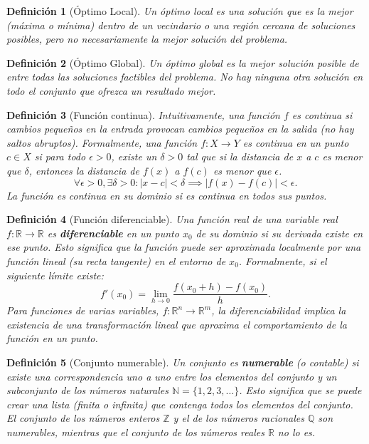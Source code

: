 \documentclass[12pt,a4paper]{book}
\newtheorem{defi}{Definición}[section]
\begin{document}
\begin{defi}[Óptimo Local]
\label{def:optimo_local}
Un óptimo local es una solución que es la mejor (máxima o mínima) dentro de un vecindario o una región cercana de soluciones posibles,
pero no necesariamente la mejor solución del problema.
\end{defi}

\begin{defi}[Óptimo Global]
\label{def:optimo_global}
Un óptimo global es la mejor solución posible de entre todas las soluciones factibles del problema.
No hay ninguna otra solución en todo el conjunto que ofrezca un resultado mejor.

\end{defi}


\begin{defi}[Función continua]
\label{def:fun_continua}
Intuitivamente, una función $f$ es continua si cambios pequeños en la entrada provocan cambios pequeños en la salida (no hay saltos abruptos). Formalmente, una función $f: X \to Y$ es continua en un punto $c \in X$ si para todo $\epsilon > 0$, existe un $\delta > 0$ tal que si la distancia de $x$ a $c$ es menor que $\delta$, entonces la distancia de $f(x)$ a $f(c)$ es menor que $\epsilon$.
$$ \forall \epsilon > 0, \exists \delta > 0 : |x-c| < \delta \implies |f(x)-f(c)| < \epsilon .$$
La función es continua en su dominio si es continua en todos sus puntos.
\end{defi}

\begin{defi}[Función diferenciable]
    \label{def:fun_diferenciable}
Una función real de una variable real $f: \mathbb{R} \to \mathbb{R}$ es \textbf{diferenciable} en un punto $x_0$ de su dominio si su derivada existe en ese punto. Esto significa que la función puede ser aproximada localmente por una función lineal (su recta tangente) en el entorno de $x_0$. Formalmente, si el siguiente límite existe:
$$ f'(x_0) = \lim_{h \to 0} \frac{f(x_0+h) - f(x_0)}{h} .$$
Para funciones de varias variables, $f: \mathbb{R}^n \to \mathbb{R}^m$, la diferenciabilidad implica la existencia de una transformación lineal  que aproxima el comportamiento de la función en un punto.
\end{defi}

\begin{defi}[Conjunto numerable]
\label{def:conjunto_numerable}
Un conjunto es \textbf{numerable} (o contable) si existe una correspondencia uno a uno entre los elementos del conjunto y un subconjunto de los números naturales $\mathbb{N} = \{1, 2, 3, \dots\}$. Esto significa que se puede crear una lista (finita o infinita) que contenga todos los elementos del conjunto. El conjunto de los números enteros $\mathbb{Z}$ y el de los números racionales $\mathbb{Q}$ son numerables, mientras que el conjunto de los números reales $\mathbb{R}$ no lo es.
\end{defi}
\end{document}
